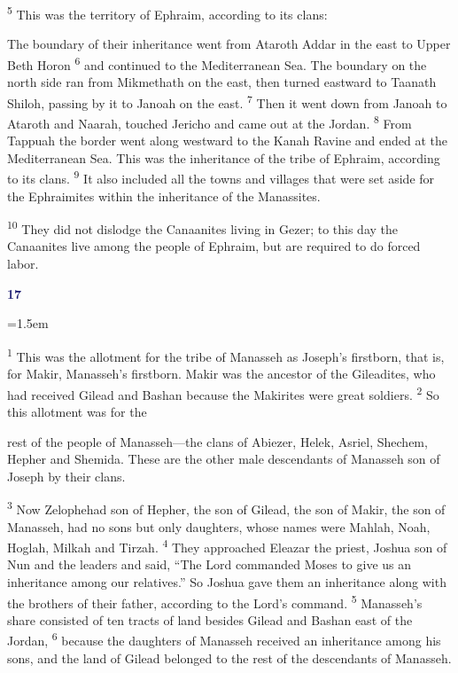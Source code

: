 \documentclass[12pt,twoside]{article}
\newcommand{\vs}[1]{\textsuperscript{#1}}
\newcommand{\chapterWithBigIndent}[2]{%
  \noindent
  \begin{minipage}[t]{1cm}
    \vspace{-0.4\baselineskip}
    {\textcolor{MidnightBlue}{\fontsize{40pt}{48pt}\selectfont \textbf{#1}}}
  \end{minipage}%
  \hspace{0.9cm}%
  \begin{minipage}[t]{\dimexpr\linewidth - 1.5cm - 0.3cm\relax}
    \hangindent=1.5em
    \hangafter=3
    #2
    \vspace{0.05cm}
  \end{minipage}
}
\begin{document}
\vs{5} This was the territory of Ephraim, according to its clans:\vspace{0.3cm}

\begin{adjustwidth}{0.5cm}{0cm}
  \hspace{0.5cm}The boundary of their inheritance went from Ataroth Addar in the east to Upper Beth Horon
  \vs{6} and continued to the Mediterranean Sea. The boundary on the north side ran from Mikmethath on the east, then turned eastward to Taanath Shiloh, passing by it to Janoah on the east.
  \vs{7} Then it went down from Janoah to Ataroth and Naarah, touched Jericho and came out at the Jordan.
  \vs{8} From Tappuah the border went along westward to the Kanah Ravine and ended at the Mediterranean Sea. This was the inheritance of the tribe of Ephraim, according to its clans.
  \vs{9} It also included all the towns and villages that were set aside for the Ephraimites within the inheritance of the Manassites.\vspace{0.3cm}
\end{adjustwidth}
\vspace{-0.3cm}\noindent \vs{10} They did not dislodge the Canaanites living in Gezer; to this day the Canaanites live among the people of Ephraim, but are required to do forced labor.

\chapterWithBigIndent{17}{
  \vs{1} This was the allotment for the tribe of Manasseh as Joseph's firstborn, that is, for Makir, Manasseh's firstborn. Makir was the ancestor of the Gileadites, who had received Gilead and Bashan because the Makirites were great soldiers.
  \vs{2} So this allotment was for the\vspace{0.05cm}

}
rest of the people of Manasseh---the clans of Abiezer, Helek, Asriel, Shechem, Hepher and Shemida. These are the other male descendants of Manasseh son of Joseph by their clans.

\vs{3} Now Zelophehad son of Hepher, the son of Gilead, the son of Makir, the son of Manasseh, had no sons but only daughters, whose names were Mahlah, Noah, Hoglah, Milkah and Tirzah.
\vs{4} They approached Eleazar the priest, Joshua son of Nun and the leaders and said, ``The Lord commanded Moses to give us an inheritance among our relatives.'' So Joshua gave them an inheritance along with the brothers of their father, according to the Lord's command.
\vs{5} Manasseh's share consisted of ten tracts of land besides Gilead and Bashan east of the Jordan,
\vs{6} because the daughters of Manasseh received an inheritance among his sons, and the land of Gilead belonged to the rest of the descendants of Manasseh.
\end{document}
